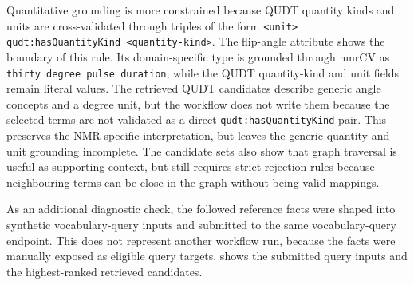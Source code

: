 Quantitative grounding is more constrained because \ac{QUDT} quantity kinds and units are cross-validated through triples of the form \texttt{<unit> qudt:hasQuantityKind <quantity-kind>}.
The flip-angle attribute shows the boundary of this rule.
Its domain-specific type is grounded through \ac{nmrCV} as \texttt{thirty degree pulse duration}, while the \ac{QUDT} quantity-kind and unit fields remain literal values.
The retrieved \ac{QUDT} candidates describe generic angle concepts and a degree unit, but the workflow does not write them because the selected terms are not validated as a direct \texttt{qudt:hasQuantityKind} pair.
This preserves the \ac{NMR}-specific interpretation, but leaves the generic quantity and unit grounding incomplete.
The candidate sets also show that graph traversal is useful as supporting context, but still requires strict rejection rules because neighbouring terms can be close in the graph without being valid mappings.

As an additional diagnostic check, the followed reference facts were shaped into synthetic vocabulary-query inputs and submitted to the same vocabulary-query endpoint.
This does not represent another workflow run, because the facts were manually exposed as eligible query targets.
 shows the submitted query inputs and the highest-ranked retrieved candidates.

